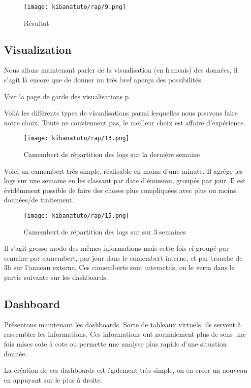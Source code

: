 \begin{figure}[H]
\center
\texttt{[image: kibanatuto/rap/9.png]}
\label{fig:kibanatuto6}
\caption{Résultat}
\end{figure}

\subsection{Visualization}
Nous allons maintenant parler de la visualisation (en francais) des données, il s'agit là encore
que de donner un très bref aperçu des possibilités.

Voir la page de garde des visualisations p\pageref{fig:kibanatuto7}

Voilà les différents types de visualisations parmi lesquelles nous pouvons faire 
notre choix. Toute ne conviennent pas, le meilleur choix est affaire d'expérience.


\begin{figure}[H]
\center
\texttt{[image: kibanatuto/rap/13.png]}
\label{fig:kibanatuto8}
\caption{Camembert de répartition des logs sur la dernière semaine}
\end{figure}
Voici un camembert très simple, réalisable en moins d'une minute. Il agrège les logs
sur une semaine en les classant par date d'émission, groupés par jour. 
Il est évidémment possible de faire des choses plus compliquées avec plus ou moins
données/de traitement.


\begin{figure}[H]
\center
\texttt{[image: kibanatuto/rap/15.png]}
\label{fig:kibanatuto9}
\caption{Camembert de répartition des logs sur sur 3 semaines}
\end{figure}
Il s'agit grosso modo des mêmes informations mais cette fois ci groupé par semaine
par camembert, par jour dans le camembert interne, et par tranche de 3h sur l'anneau
externe. Ces camemberts sont interactifs, on le verra dans la partie suivante sur 
les dashboards.


\subsection{Dashboard}
Présentons maintenant les dashboards. Sorte de tableaux virtuels, ils servent à rassembler
les informations. Ces informations ont normalement plus de sens une fois mises cote 
à cote ou permette une analyse plus rapide d'une situation donnée.

La création de ces dashboards est également très simple, on en créer un nouveau en 
appuyant sur le plus à droite.

